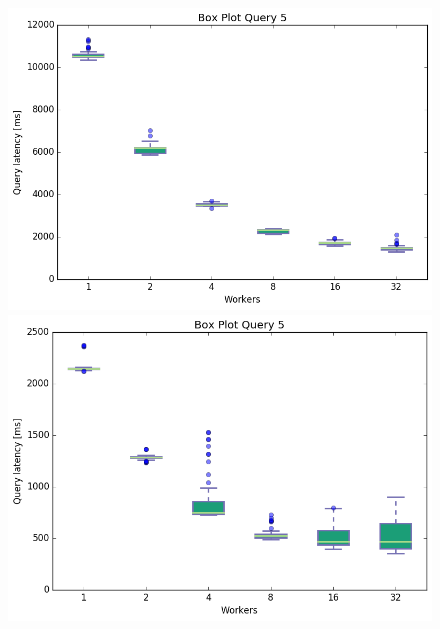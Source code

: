 \documentclass[11pt,singlecolumn]{scrartcl}
\begin{document}
\begin{figure}[!tbp]
  \centering
  \RawFloats
  \begin{minipage}[b]{0.5\textwidth}
    \includegraphics[width=\textwidth]{boxesfl/q5}
  \end{minipage}
  \hfill
  \begin{minipage}[b]{0.5\textwidth}
    \includegraphics[width=\textwidth]{boxesfs/q5}
  \end{minipage}
\end{figure}
\end{document}
